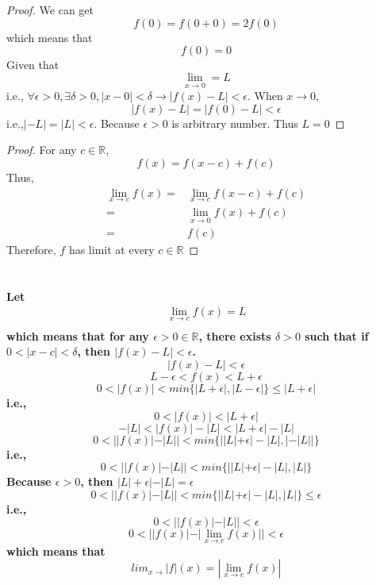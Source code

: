 \documentclass{article}
\begin{document}
        \section{}
            \begin{proof}
                We can get
                $$f(0)=f(0+0)=2f(0)$$
                which means that $$f(0)=0$$
                Given that$$\lim_{x\rightarrow 0}=L$$
                i.e., $\forall \epsilon>0,\exists \delta>0,|x-0|<\delta\rightarrow|f(x)-L|<\epsilon$. When $x\rightarrow 0$, $$|f(x)-L|=|f(0)-L|<\epsilon$$
                i.e.,$|-L|=|L|<\epsilon$. Because $\epsilon>0$ is arbitrary number.
                Thus $L=0$ 
            \end{proof}
            \begin{proof}
                For any $c\in \mathbb{R}$, $$f(x)=f(x-c)+f(c)$$
                Thus, 
                \begin{equation*}
                    \begin{split}
                        \lim_{x\rightarrow c}f(x)=&\lim_{x\rightarrow c}f(x-c)+f(c)\\
                            =&\lim_{x\rightarrow 0}f(x)+f(c)\\
                            =&f(c)
                    \end{split}
                \end{equation*}
                Therefore, $f$ has limit at every $c\in \mathbb{R}$
            \end{proof}
    \section{}
        \paragraph{
            Let
            \begin{equation*}
                \begin{split}
                    \lim_{x\rightarrow c}f(x)=L\\
                \end{split}
            \end{equation*}
            which means that for any $\epsilon>0\in \mathbb{R}$, there exists $\delta>0$ such that if $0<|x-c|<\delta$, then $|f(x)-L|<\epsilon$.
            $$|f(x)-L|<\epsilon$$
            $$L-\epsilon<f(x)<L+\epsilon$$
            $$0<|f(x)|<min\{|L+\epsilon|,|L-\epsilon|\}\leq|L+\epsilon|$$
            i.e.,
            $$0<|f(x)|<|L+\epsilon|$$
            $$-|L|<|f(x)|-|L|<|L+\epsilon|-|L|$$
            $$0<||f(x)|-|L||<min\{||L|+\epsilon|-|L|,|-|L||\}$$
            i.e.,
            $$0<||f(x)|-|L||<min\{||L|+\epsilon|-|L|,|L|\}$$
            Because $\epsilon>0$, then $|L|+\epsilon|-|L|=\epsilon$
            $$0<||f(x)|-|L||<min\{||L|+\epsilon|-|L|,|L|\}\leq \epsilon$$
            i.e.,
            $$0<||f(x)|-|L||<\epsilon$$
            $$0<||f(x)|-|\lim_{x\rightarrow c}f(x)||<\epsilon$$
            which means that
            $$lim_{x\rightarrow}|f|(x)=|\lim_{x\rightarrow c}f(x)|$$
        }
\end{document}
